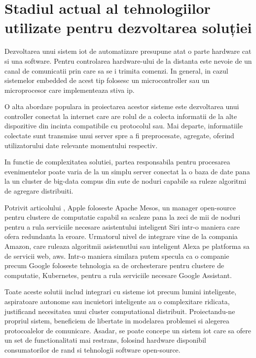 \section {Stadiul actual al tehnologiilor utilizate pentru dezvoltarea soluției}

Dezvoltarea unui sistem \acrshort{iot} de automatizare presupune atat o parte hardware cat si una software. Pentru controlarea hardware-ului de la distanta este nevoie de un canal de comunicatii prin care sa se i trimita comenzi. In general, in cazul sistemelor embedded de acest tip folosesc un microcontroller sau un microprocesor care implementeaza stiva \acrshort{ip}.

O alta abordare populara in proiectarea acestor sisteme este dezvoltarea unui controller conectat la internet care are rolul de a colecta informatii de la alte dispozitive din incinta compatibile cu protocolul sau. Mai departe, informatiile colectate sunt transmise unui server spre a fi preprocesate, agregate, oferind utilizatorului date relevante momentului respectiv.

In functie de complexitatea solutiei, partea responsabila pentru procesarea evenimentelor poate varia de la un simplu server conectat la o baza de date pana la un cluster de big-data compus din sute de noduri capabile sa ruleze algoritmi de agregare distribuiti.

Potrivit articolului \cite{AppleRebuildsSiriMesos}, Apple foloseste Apache Mesos, un manager open-source pentru clustere de computatie capabil sa scaleze pana la zeci de mii de noduri pentru a rula serviciile necesare asistentului inteligent Siri intr-o maniera care ofera redundanta la eroare. Urmatorul nivel de integrare vine de la compania Amazon, care ruleaza algoritmii asistenutlui sau inteligent Alexa pe platforma sa de servicii web, \acrfull{aws}. Intr-o maniera similara putem specula ca o companie precum Google foloseste tehnologia sa de orchesterare pentru clustere de computatie, Kubernetes, pentru a rula serviciile necesare Google Assistant.

Toate aceste solutii includ integrari cu sisteme \acrshort{iot} precum lumini inteligente, aspiratoare autonome sau incuietori inteligente au o complexitare ridicata, justificand necesitatea unui cluster computational distribuit. Proiectandu-ne propriul sistem, beneficiem de libertate in modelarea problemei si alegerea protocoalelor de comunicare. Asadar, se poate concepe un sistem \acrshort{iot} care sa ofere un set de functionalitati mai restrans, folosind hardware disponibil consumatorilor de rand si tehnologii software open-source.


